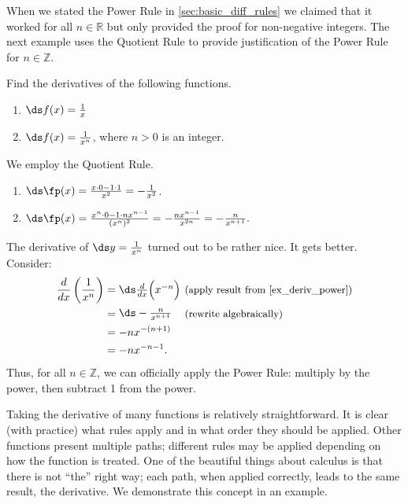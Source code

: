 When we stated the Power Rule in \autoref{sec:basic_diff_rules} we claimed that it worked for all $n\in\mathbb{R}$ but only provided the proof for non-negative integers. The next example uses the Quotient Rule to provide justification of the Power Rule for  $n\in\mathbb{Z}$.

\begin{example}\label{ex_deriv_power}
Find the derivatives of the following functions. 
\begin{enumerate}
	\item	$\ds f(x) = \frac{1}{x}$
	\item	$\ds f(x)= \frac{1}{x^n}$, where $n>0$ is an integer.
\end{enumerate}
\solution
We employ the Quotient Rule.
\begin{enumerate}
	\item	$\ds \fp(x) = \frac{x\cdot 0 - 1\cdot 1}{x^2} = -\frac{1}{x^2}$.
	\item	$\ds \fp(x) = \frac{x^n\cdot 0 - 1\cdot nx^{n-1}}{(x^n)^2} = -\frac{nx^{n-1}}{x^{2n}} = -\frac{n}{x^{n+1}}.$\eoehere
\end{enumerate}
\end{example}

The derivative of $\ds y=\frac{1}{x^n}$ turned out to be rather nice. It gets better. Consider:
\begin{align*}
	\frac{d}{dx}\left(\frac{1}{x^n}\right)
	&= \parbox{60pt}{$\ds\frac{d}{dx}\Big(x^{-n}\Big)$}
	\text{\small (apply result from \autoref{ex_deriv_power})}\\
	&= \parbox{60pt}{$\ds-\frac{n}{x^{n+1}}$}\text{\small (rewrite algebraically)} \\
	&= -nx^{-(n+1)} \\
	&= -nx^{-n-1}.
\end{align*}
Thus, for all $n\in\mathbb{Z}$, we can officially apply the Power Rule: multiply by the power, then subtract 1 from the power.

Taking the derivative of many functions is relatively straightforward. It is clear (with practice) what rules apply and in what order they should be applied. Other functions present multiple paths; different rules may be applied depending on how the function is treated. One of the beautiful things about calculus is that there is not ``the'' right way; each path, when applied correctly, leads to the same result, the derivative. We demonstrate this concept in an example.

